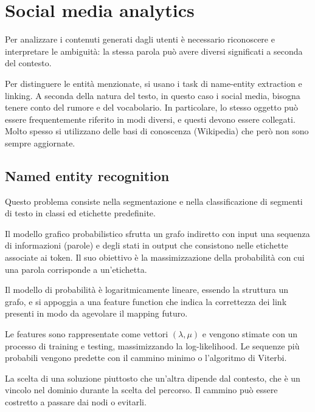 \section{Social media analytics}
Per analizzare i contenuti generati dagli utenti è necessario riconoscere e interpretare le ambiguità: la stessa parola può avere diversi significati a seconda del contesto.

Per distinguere le entità menzionate, si usano i task di name-entity extraction e linking. A seconda della natura del testo, in questo caso i social media, bisogna tenere conto del rumore e del vocabolario. In particolare, lo stesso oggetto può essere frequentemente riferito in modi diversi, e questi devono essere collegati. Molto spesso si utilizzano delle basi di conoscenza (Wikipedia) che però non sono sempre aggiornate.

\subsection{Named entity recognition}
Questo problema consiste nella segmentazione e nella classificazione di segmenti di testo in classi ed etichette predefinite. 

Il modello grafico probabilistico sfrutta un grafo indiretto con input una sequenza di informazioni (parole) e degli stati in output che consistono nelle etichette associate ai token. Il suo obiettivo è la massimizzazione della probabilità con cui una parola corrisponde a un'etichetta.

Il modello di probabilità è logaritmicamente lineare, essendo la struttura un grafo, e si appoggia a una feature function che indica la correttezza dei link presenti in modo da agevolare il mapping futuro. 

Le features sono rappresentate come vettori $(\lambda, \mu)$ e vengono stimate con un processo di training e testing, massimizzando la log-likelihood. Le sequenze più probabili vengono predette con il cammino minimo o l'algoritmo di Viterbi.

La scelta di una soluzione piuttosto che un'altra dipende dal contesto, che è un vincolo nel dominio durante la scelta del percorso. Il cammino può essere costretto a passare dai nodi o evitarli. 

